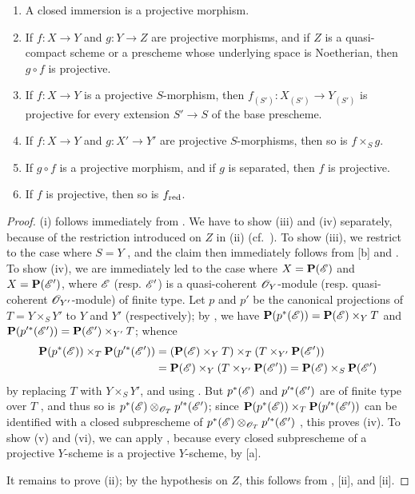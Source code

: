 \begin{proposition}[5.5.5]
\label{II.5.5.5}
\medskip\noindent
\begin{enumerate}
  \item[{\rm(i)}] A closed immersion is a projective morphism.
  \item[{\rm(ii)}] If $f:X\to Y$ and $g:Y\to Z$ are projective morphisms, and if $Z$ is a quasi-compact scheme or a prescheme whose underlying space is Noetherian, then $g\circ f$ is projective.
  \item[{\rm(iii)}] If $f:X\to Y$ is a projective $S$-morphism, then $f_{(S')}:X_{(S')}\to Y_{(S')}$ is projective for every extension $S'\to S$ of the base prescheme.
  \item[{\rm(iv)}] If $f:X\to Y$ and $g:X'\to Y'$ are projective $S$-morphisms, then so is $f\times_S g$.
  \item[{\rm(v)}] If $g\circ f$ is a projective morphism, and if $g$ is separated, then $f$ is projective.
  \item[{\rm(vi)}] If $f$ is projective, then so is $f_{\mathrm{red}}$.
\end{enumerate}
\end{proposition}

\begin{proof}
(i) follows immediately from .
We have to show (iii) and (iv) separately, because of the restriction introduced on $Z$ in (ii) (cf.~).
To show (iii), we restrict to the case where $S=Y$ , and the claim then immediately follows from [b] and .
To show (iv), we are immediately led to the case where $X=\mathbf{P}(\mathscr{E})$ and $X=\mathbf{P}(\mathscr{E}')$, where $\mathscr{E}$ (resp. $\mathscr{E}'$) is a quasi-coherent $\mathscr{O}_Y$-module (resp. quasi-coherent $\mathscr{O}_{Y'}$-module) of finite type.
Let $p$ and $p'$ be the canonical projections of $T=Y\times_S Y'$ to $Y$ and $Y'$ (respectively); by , we have $\mathbf{P}(p^*(\mathscr{E})) = \mathbf{P}(\mathscr{E})\times_Y T$ and $\mathbf{P}(p^{\prime *}(\mathscr{E}'))=\mathbf{P}(\mathscr{E}')\times_{Y'}T$; whence
\begin{align*}
  \mathbf{P}(p^*(\mathscr{E}))\times_T\mathbf{P}(p^{\prime *}(\mathscr{E}'))&=(\mathbf{P}(\mathscr{E})\times_Y T)\times_T(T\times_{Y'}\mathbf{P}(\mathscr{E}'))\\
                                              &=\mathbf{P}(\mathscr{E})\times_Y(T\times_{Y'}\mathbf{P}(\mathscr{E}'))=\mathbf{P}(\mathscr{E})\times_S\mathbf{P}(\mathscr{E}')
\end{align*}
by replacing $T$ with $Y\times_S Y'$, and using .
But $p^*(\mathscr{E})$ and $p^{\prime *}(\mathscr{E}')$ are of finite type over $T$ , and thus so is $p^*(\mathscr{E})\otimes_{\mathscr{O}_T}p^{\prime *}(\mathscr{E}')$;
since $\mathbf{P}(p^*(\mathscr{E}))\times_T\mathbf{P}(p^{\prime *}(\mathscr{E}'))$ can be identified with a closed subprescheme of $p^*(\mathscr{E})\otimes_{\mathscr{O}_T}p^{\prime *}(\mathscr{E}')$ , this proves (iv).
To show (v) and (vi), we can apply , because every closed subprescheme of a projective $Y$-scheme is a projective $Y$-scheme, by [a].

It remains to prove (ii); by the hypothesis on $Z$, this follows from , [ii], and [ii].
\end{proof}

